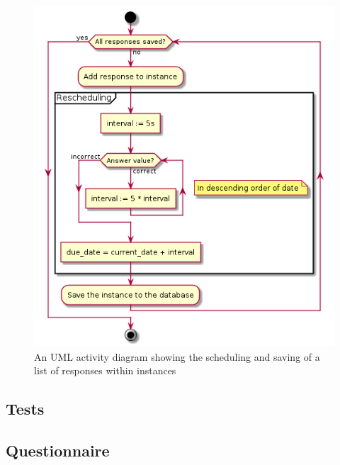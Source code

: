 \begin{figure}
\centering
    \includegraphics[height=.5\textheight]{img/learningserver.png}
\caption{An UML activity diagram showing the scheduling and saving of a list of responses within instances}
\label{fig:learningserver}
\end{figure}

\subsection{Tests}

\subsection{Questionnaire}
